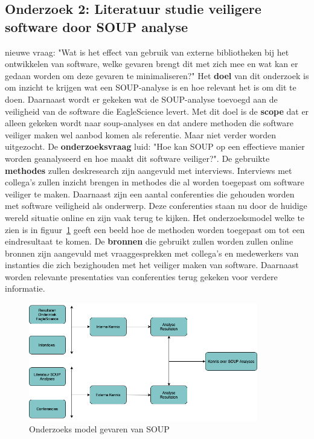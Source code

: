 \subsection{Onderzoek 2: Literatuur studie veiligere software door SOUP analyse}\label{subsec:onderzoek-literatuur-studie-soup}
nieuwe vraag: "Wat is het effect van gebruik van externe bibliotheken bij het ontwikkelen van software, welke gevaren brengt dit met zich mee en wat kan er gedaan worden om deze gevaren te minimaliseren?"
Het \textbf{doel} van dit onderzoek is om inzicht te krijgen wat een SOUP-analyse is en hoe relevant het is om dit te doen. Daarnaast wordt er gekeken wat de SOUP-analyse toevoegd aan de veiligheid van de software die EagleScience levert. Met dit doel is de \textbf{scope} dat er alleen gekeken wordt naar soup-analyses en dat andere methoden die software veiliger maken wel aanbod komen als referentie. Maar niet verder worden uitgezocht.  De \textbf{onderzoeksvraag} luid: "Hoe kan SOUP op een effectieve manier worden geanalyseerd en hoe maakt dit software veiliger?". De gebruikte \textbf{methodes} zullen deskresearch zijn aangevuld met interviews. Interviews met collega's zullen inzicht brengen in methodes die al worden toegepast om software veiliger te maken. Daarnaast zijn een aantal conferenties die gehouden worden met software veiligheid als onderwerp. Deze conferenties staan nu door de huidige wereld situatie online en zijn vaak terug te kijken. Het onderzoeksmodel welke te zien is in figuur~\ref{fig:OnderzoeksModelNoodZaakSOUP} geeft een beeld hoe de methoden worden toegepast om tot een eindresultaat te komen. De \textbf{bronnen} die gebruikt zullen worden zullen online bronnen zijn aangevuld met vraaggesprekken met collega's en medewerkers van instanties die zich bezighouden met het veiliger maken van software. Daarnaast worden relevante presentaties van conferenties terug gekeken voor verdere informatie.
\begin{figure}[htbp]
    \myfloatalign
    \includegraphics[width=10cm]{gfx/OnderzoeksmodelSOUP}
    \caption{Onderzoeks model gevaren van SOUP}
    \label{fig:OnderzoeksModelNoodZaakSOUP}
\end{figure}

